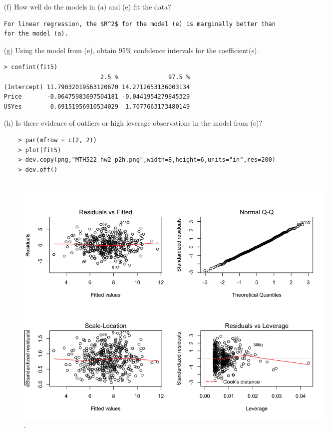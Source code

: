 \documentclass{article}
\begin{document}
\begin{itemize}
\begin{program}
\begin{verbatim}
	\end{verbatim}
\end{program}


\item[(f)] How well do the models in (a) and (e) fit the data?

\begin{lstlisting}
For linear regression, the $R^2$ for the model (e) is marginally better than 
for the model (a).  
\end{lstlisting}


\item[(g)] Using the model from (e), obtain 95$\%$ confidence intervals for the coefficient(s).

\begin{program}
	\begin{verbatim}
> confint(fit5)
                           2.5 %              97.5 %
(Intercept) 11.79032019563120670 14.2712653136003134
Price       -0.06475983697504181 -0.0441954279845329
USYes        0.69151956910534029  1.7077663173480149
\end{verbatim}
\end{program}

\newpage

\item[(h)] Is there evidence of outliers or high leverage observations in the model from (e)?

\begin{program}
	\begin{verbatim}
	> par(mfrow = c(2, 2))
	> plot(fit5)
	> dev.copy(png,"MTH522_hw2_p2h.png",width=8,height=6,units="in",res=200)
	> dev.off()
	
	\end{verbatim}
	\caption{The R code used to generate Figure.\ \ref{fig:MTH522_hw2_p2h}.}
\end{program}


\begin{figure}[htb]
	\begin{center}
		\includegraphics[width=0.8\textwidth]{MTH522_hw2_p2h.png}
	\end{center}
	\caption{.}
	\label{fig:MTH522_hw2_p2h}
\end{figure}


\end{itemize}
\end{document}

